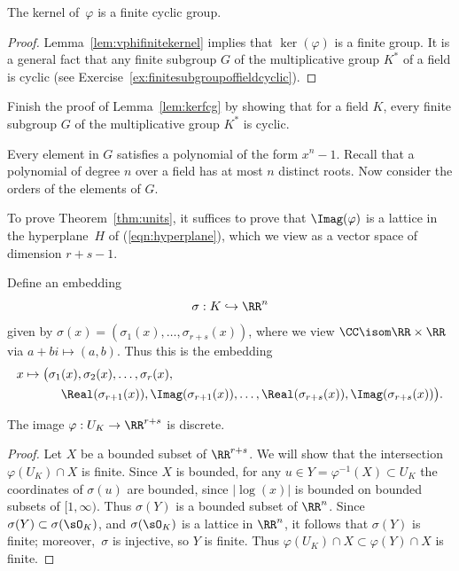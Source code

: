\begin{lemma}\label{lem:kerfcg}
  The kernel of~$\varphi$ is a finite cyclic group.
\end{lemma}
\begin{proof}
  Lemma~\ref{lem:vphifinitekernel} implies that $\ker(\varphi)$ is a
  finite group.  It is a general fact that any finite subgroup $G$ of
  the multiplicative group $K^*$ of a field is cyclic (see
  Exercise~\ref{ex:finitesubgroupoffieldcyclic}).
\end{proof}

\begin{exercise}\label{ex:finitesubgroupoffieldcyclic}
  Finish the proof of Lemma~\ref{lem:kerfcg}
  by showing that for a field $K$, every finite
  subgroup $G$ of the multiplicative group $K^*$
  is cyclic.
  
  \begin{hint}
    Every element in $G$ satisfies a polynomial
    of the form $x^n-1$. Recall that a polynomial
    of degree $n$ over a field has at most $n$
    distinct roots. Now consider the orders
    of the elements of $G$.
  \end{hint}
\end{exercise}

To prove Theorem~\ref{thm:units}, it suffices to prove that
$\Imag(\varphi)$ is a lattice in the hyperplane~$H$ of
(\ref{eqn:hyperplane}), which we view as a vector space of dimension
$r+s-1$.

Define an embedding
\begin{equation}\label{eqn:sigma3}
  \sigma : K \hookrightarrow \RR^n
\end{equation}
given by $\sigma(x) = (\sigma_1(x),\dots,\sigma_{r+s}(x))$,
where we view $\CC\isom \RR\times \RR$ via $a+b i\mapsto (a,b)$.
Thus this is the embedding
\begin{align*}
  x\mapsto \big(&\sigma_1(x), \sigma_2(x),\dots, \sigma_r(x), \\
  &\quad \Real(\sigma_{r+1}(x)), \Imag(\sigma_{r+1}(x)),
  \dots, \Real(\sigma_{r+s}(x)), \Imag(\sigma_{r+s}(x))\big).
\end{align*}

\begin{lemma}\label{lem:ukdiscrete}
  The image $\varphi:U_K\to \RR^{r+s}$ is discrete.
\end{lemma}
\begin{proof}
  Let $X$ be a bounded subset of $\RR^{r+s}$.
  We will show that the intersection $\varphi(U_K)\cap X$ is finite.
  Since $X$ is bounded, for any $u\in Y=\varphi^{-1}(X)\subset U_K$ the
  coordinates of $\sigma(u)$ are bounded, since $|\log(x)|$ is bounded on
  bounded subsets of $[1,\infty)$. Thus $\sigma(Y)$ is a bounded subset
  of $\RR^n$.  Since $\sigma(Y)\subset \sigma(\sO_K)$, and $\sigma(\sO_K)$ is
  a lattice in $\RR^n$, it follows that $\sigma(Y)$ is finite;
  moreover,~$\sigma$ is injective, so $Y$ is finite.
  Thus $\varphi(U_K)\cap X \subset \varphi(Y) \cap X$ is finite.
\end{proof}

